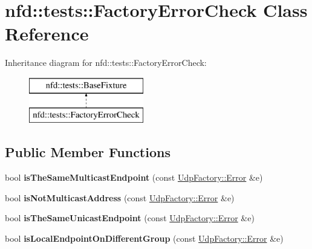 \hypertarget{classnfd_1_1tests_1_1FactoryErrorCheck}{}\section{nfd\+:\+:tests\+:\+:Factory\+Error\+Check Class Reference}
\label{classnfd_1_1tests_1_1FactoryErrorCheck}
Inheritance diagram for nfd\+:\+:tests\+:\+:Factory\+Error\+Check\+:\begin{figure}[H]
\begin{center}
\leavevmode
\includegraphics[height=2.000000cm]{classnfd_1_1tests_1_1FactoryErrorCheck}
\end{center}
\end{figure}
\subsection*{Public Member Functions}
\begin{DoxyCompactItemize}
\item 
bool {\bfseries is\+The\+Same\+Multicast\+Endpoint} (const \hyperlink{classnfd_1_1UdpFactory_1_1Error}{Udp\+Factory\+::\+Error} \&e)\hypertarget{classnfd_1_1tests_1_1FactoryErrorCheck_acf839575c92983e6c82a73b97115be27}{}\label{classnfd_1_1tests_1_1FactoryErrorCheck_acf839575c92983e6c82a73b97115be27}

\item 
bool {\bfseries is\+Not\+Multicast\+Address} (const \hyperlink{classnfd_1_1UdpFactory_1_1Error}{Udp\+Factory\+::\+Error} \&e)\hypertarget{classnfd_1_1tests_1_1FactoryErrorCheck_a69600f6a83a96da4efc2daad49e88f74}{}\label{classnfd_1_1tests_1_1FactoryErrorCheck_a69600f6a83a96da4efc2daad49e88f74}

\item 
bool {\bfseries is\+The\+Same\+Unicast\+Endpoint} (const \hyperlink{classnfd_1_1UdpFactory_1_1Error}{Udp\+Factory\+::\+Error} \&e)\hypertarget{classnfd_1_1tests_1_1FactoryErrorCheck_a5b91bb27738a4627091f772024816b43}{}\label{classnfd_1_1tests_1_1FactoryErrorCheck_a5b91bb27738a4627091f772024816b43}

\item 
bool {\bfseries is\+Local\+Endpoint\+On\+Different\+Group} (const \hyperlink{classnfd_1_1UdpFactory_1_1Error}{Udp\+Factory\+::\+Error} \&e)\hypertarget{classnfd_1_1tests_1_1FactoryErrorCheck_aaf6045a441f0eee7cdf7f0831e2523dc}{}\label{classnfd_1_1tests_1_1FactoryErrorCheck_aaf6045a441f0eee7cdf7f0831e2523dc}

\end{DoxyCompactItemize}
